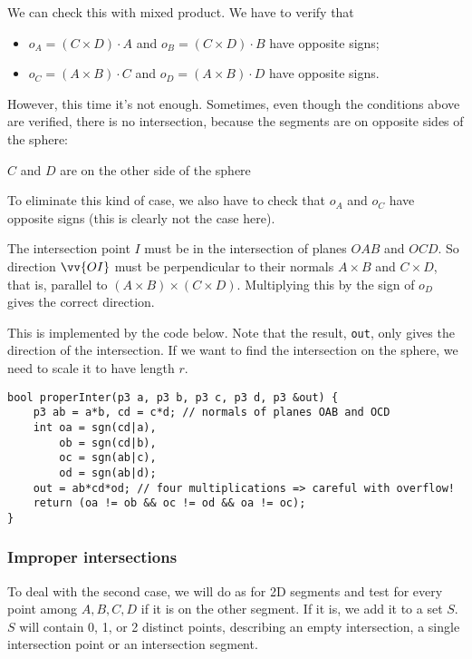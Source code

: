 
We can check this with mixed product. We have to verify that
\begin{itemize}
\item $o_A = (C \times D) \cdot A$ and $o_B = (C \times D) \cdot B$ have opposite signs;
\item $o_C = (A \times B) \cdot C$ and $o_D = (A \times B) \cdot D$ have opposite signs.
\end{itemize}

However, this time it's not enough. Sometimes, even though the conditions above are verified, there is no intersection, because the segments are on opposite sides of the sphere:

\begin{center}
    
    $C$ and $D$ are on the other side of the sphere
\end{center}

To eliminate this kind of case, we also have to check that $o_A$ and $o_C$ have opposite signs (this is clearly not the case here).


The intersection point $I$ must be in the intersection of planes $OAB$ and $OCD$.
So direction $\vv{OI}$ must be perpendicular to their normals $A \times B$ and $C \times D$, that is, parallel to $(A \times B) \times (C \times D)$.
Multiplying this by the sign of $o_D$ gives the correct direction.

This is implemented by the code below. Note that the result, \lstinline|out|, only gives the direction of the intersection. If we want to find the intersection on the sphere, we need to scale it to have length $r$.
\begin{lstlisting}
bool properInter(p3 a, p3 b, p3 c, p3 d, p3 &out) {
    p3 ab = a*b, cd = c*d; // normals of planes OAB and OCD
    int oa = sgn(cd|a),
        ob = sgn(cd|b),
        oc = sgn(ab|c),
        od = sgn(ab|d);
    out = ab*cd*od; // four multiplications => careful with overflow!
    return (oa != ob && oc != od && oa != oc);
}
\end{lstlisting}

\subsubsection{Improper intersections}
To deal with the second case, we will do as for 2D segments and test for every point among $A,B,C,D$ if it is on the other segment. If it is, we add it to a set $S$. $S$ will contain 0, 1, or 2 distinct points, describing an empty intersection, a single intersection point or an intersection segment.

